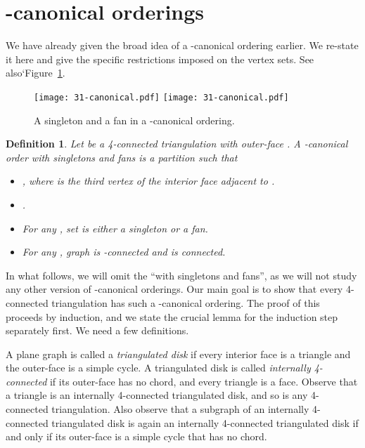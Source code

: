 \documentclass[12pt]{article}
\newtheorem{definition}{Definition}
\begin{document}
\section{-canonical orderings}


We have already given the broad idea of a -canonical ordering
earlier.  We re-state it here and give the specific
restrictions imposed  on the vertex sets.  See also`Figure~\ref{fig:fan}.

\begin{figure}[ht]
\hspace*{\fill}
\texttt{[image: 31-canonical.pdf]}
\hspace*{\fill}
\texttt{[image: 31-canonical.pdf]}
\hspace*{\fill}
\caption{A singleton  and a fan  in a -canonical
ordering.}
\label{fig:fan}
\end{figure}

\begin{definition}
Let  be a 4-connected triangulation with outer-face .
A {\em -canonical order with singletons and fans} is a partition 
such that
\begin{itemize}
\item , where  is the third vertex of the
	interior face adjacent to .
\item .
\item For any , set  is either a singleton or a fan.
\item For any , graph  is -connected 
	and  is connected.
\end{itemize}
\end{definition}

In what follows, we will omit the ``with singletons and fans'', as we
will not study any other version of -canonical orderings.
Our main goal is to show that every 4-connected triangulation
has such a -canonical ordering.  The proof of this proceeds
by induction, and we state the crucial lemma for the induction
step separately first.  We need a few definitions.

A plane graph is called a {\em triangulated disk} if every interior
face is a triangle and the outer-face is a simple cycle.
A triangulated disk is called {\em internally 4-connected} if its
outer-face has no chord, and every triangle is a face.
Observe that a triangle is an internally 4-connected triangulated disk,
and so is any 4-connected triangulation.  Also observe that a subgraph
of an internally 4-connected triangulated disk is again an internally
4-connected triangulated disk if and only if its outer-face is a simple
cycle that has no chord.
\end{document}
